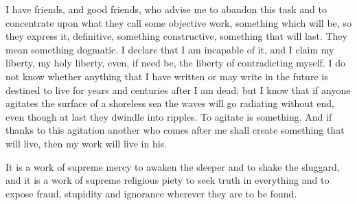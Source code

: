 I have friends, and good friends, who advise me to abandon this task
and to concentrate upon what they  call some objective work,
something which will be, so they express it, definitive, something
constructive, something that will last. They mean something dogmatic.
I declare that I am incapable of it, and I claim my liberty, my holy
liberty, even, if need be, the liberty of contradicting myself. I do
not know whether anything that I have written or may write in the
future is destined to live for years and centuries after I am dead;
but I know that if anyone agitates the surface of a shoreless sea the
waves will go radiating without end, even though at last they dwindle
into ripples. To agitate is something. And if thanks to this agitation
another who comes after me shall create something that will live, then
my work will live in his.

It is a work of supreme mercy to awaken the sleeper and to shake the
sluggard, and it is a work of supreme religious piety to seek truth in
everything and to expose fraud, stupidity and ignorance wherever they
are to be found.

